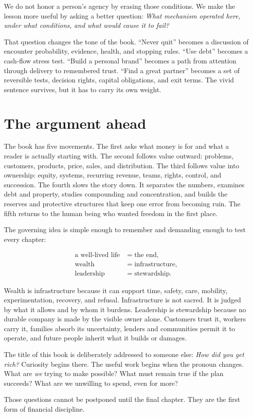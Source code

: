We do not honor a person's agency by erasing those conditions. We make the
lesson more useful by asking a better question: \emph{What mechanism operated
here, under what conditions, and what would cause it to fail?}

That question changes the tone of the book. ``Never quit'' becomes a discussion
of encounter probability, evidence, health, and stopping rules. ``Use debt''
becomes a cash-flow stress test. ``Build a personal brand'' becomes a path from
attention through delivery to remembered trust. ``Find a great partner''
becomes a set of reversible tests, decision rights, capital obligations, and
exit terms. The vivid sentence survives, but it has to carry its own weight.

\section*{The argument ahead}

The book has five movements. The first asks what money is for and what a reader
is actually starting with. The second follows value outward: problems,
customers, products, price, sales, and distribution. The third follows value
into ownership: equity, systems, recurring revenue, teams, rights, control, and
succession. The fourth slows the story down. It separates the numbers, examines
debt and property, studies compounding and concentration, and builds the
reserves and protective structures that keep one error from becoming ruin. The
fifth returns to the human being who wanted freedom in the first place.

The governing idea is simple enough to remember and demanding enough to test
every chapter:

\begin{equation}
\begin{aligned}
\text{a well-lived life}&=\text{the end},\\
\text{wealth}&=\text{infrastructure},\\
\text{leadership}&=\text{stewardship}.
\end{aligned}
\end{equation}

Wealth is infrastructure because it can support time, safety, care, mobility,
experimentation, recovery, and refusal. Infrastructure is not sacred. It is
judged by what it allows and by whom it burdens. Leadership is stewardship
because no durable company is made by the visible owner alone. Customers trust
it, workers carry it, families absorb its uncertainty, lenders and communities
permit it to operate, and future people inherit what it builds or damages.

The title of this book is deliberately addressed to someone else: \emph{How
did you get rich?} Curiosity begins there. The useful work begins when the pronoun
changes. What are \emph{we} trying to make possible? What must remain true if
the plan succeeds? What are we unwilling to spend, even for more?

Those questions cannot be postponed until the final chapter. They are the
first form of financial discipline.
